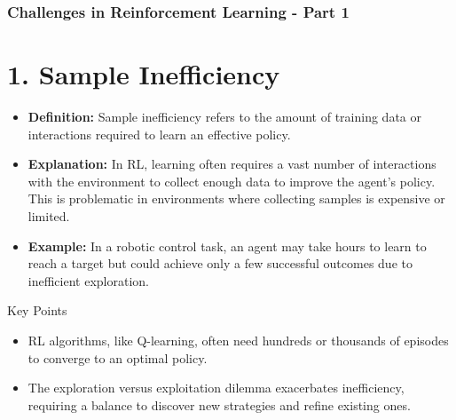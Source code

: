 \documentclass[aspectratio=169]{beamer}
\begin{document}
\begin{frame}[fragile]
    \frametitle{Challenges in Reinforcement Learning - Part 1}
    \section*{1. Sample Inefficiency}
    \begin{itemize}
        \item \textbf{Definition:} Sample inefficiency refers to the amount of training data or interactions required to learn an effective policy.
        \item \textbf{Explanation:} In RL, learning often requires a vast number of interactions with the environment to collect enough data to improve the agent's policy. This is problematic in environments where collecting samples is expensive or limited.
        \item \textbf{Example:} In a robotic control task, an agent may take hours to learn to reach a target but could achieve only a few successful outcomes due to inefficient exploration.
    \end{itemize}

    \begin{block}{Key Points}
        \begin{itemize}
            \item RL algorithms, like Q-learning, often need hundreds or thousands of episodes to converge to an optimal policy.
            \item The exploration versus exploitation dilemma exacerbates inefficiency, requiring a balance to discover new strategies and refine existing ones.
        \end{itemize}
    \end{block}
\end{frame}
\end{document}
